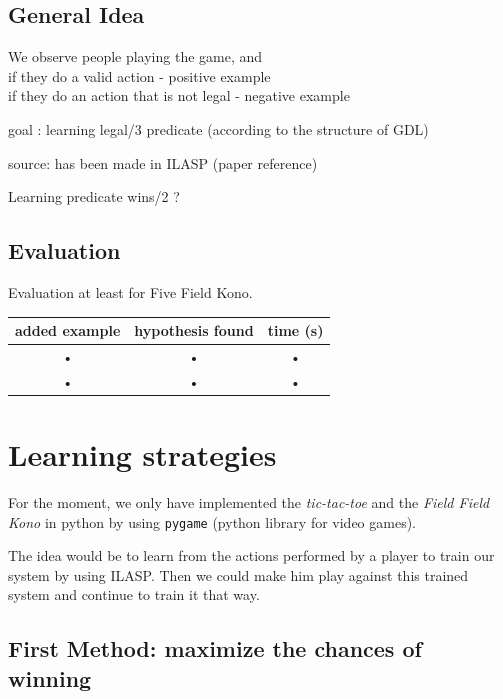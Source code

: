 \documentclass[12pt,twoside]{report}
\begin{document}
\section{General Idea}

We observe people playing the game, and \\
if they do a valid action - positive example\\
if they do an action that is not legal - negative example\\

\bigskip

goal : learning legal/3 predicate (according to the structure of GDL)

\bigskip

source:  has been made in ILASP (paper reference)%

\bigskip

Learning predicate wins/2 ?

\section{Evaluation}

Evaluation at least for Five Field Kono.

\bigskip

\begin{tabular}{|c|c|c|}
\hline 
added example & hypothesis found & time (s) \\ 
\hline 
\hline
• & • & • \\ 
\hline 
• & • & • \\ 
\hline 
\end{tabular} 

\chapter{Learning strategies}

% 

For the moment, we only have implemented the \textit{tic-tac-toe} and the \textit{Field Field Kono} in python by using \texttt{pygame} (python library for video games).
\smallskip

The idea would be to learn from the actions performed by a player to train our system by using ILASP. Then we could make him play against this trained system and continue to train it that way.

\section{First Method: maximize the chances of winning}
\end{document}
